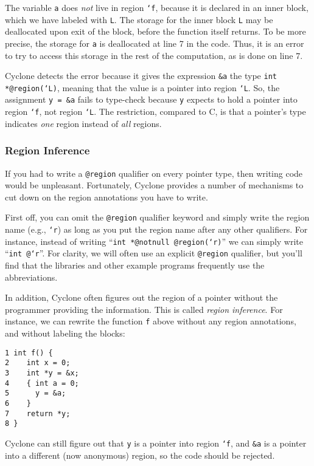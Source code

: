 The variable \texttt{a} does \emph{not} live in region \texttt{`f},
because it is declared in an inner block, which we have labeled with
\texttt{L}.  The storage for the inner block \texttt{L} may be
deallocated upon exit of the block, before the function itself
returns.  To be more precise, the storage for \texttt{a} is
deallocated at line 7 in the code.  Thus, it is an error to try to
access this storage in the rest of the computation, as is done on line
7.

Cyclone detects the error because it gives the expression \texttt{\&a}
the type \texttt{int *@region(`L)}, meaning that the value is a
pointer into region \texttt{`L}.  So, the assignment \texttt{y = \&a}
fails to type-check because \texttt{y} expects to hold a pointer into
region \texttt{`f}, not region \texttt{`L}.  The restriction, compared
to C, is that a pointer's type indicates \emph{one} region instead of
\emph{all} regions.

\subsubsection*{Region Inference}

If you had to write a \texttt{@region} qualifier on every
pointer type, then writing code would be unpleasant.
Fortunately, Cyclone provides a number of mechanisms to
cut down on the region annotations you have to write.  

First off, you can omit the \texttt{@region} qualifier keyword
and simply write the region name (e.g., \texttt{`r}) as long
as you put the region name after any other qualifiers.  For
instance, instead of writing ``\texttt{int *@notnull @region(`r)}''
we can simply write ``\texttt{int @`r}''.  For clarity,
we will often use an explicit \texttt{@region} qualifier, but
you'll find that the libraries and other example programs frequently
use the abbreviations.  

In addition, Cyclone often figures out the region of a pointer
without the programmer providing the information.  This is called {\em
region inference}.  For instance, we can rewrite the function
\texttt{f} above without any region annotations, and without 
labeling the blocks:
\begin{verbatim}
1 int f() {
2    int x = 0;
3    int *y = &x;
4    { int a = 0;
5      y = &a;
6    }
7    return *y;
8 }
\end{verbatim}
Cyclone can still figure out that \texttt{y} is a pointer into
region \texttt{`f}, and \texttt{\&a} is a pointer into a different
(now anonymous) region, so the code should be rejected.

